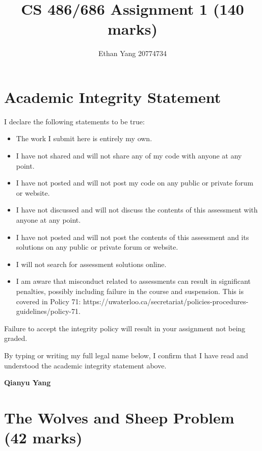 \documentclass[12pt]{article}
\title{CS 486/686 Assignment 1 (140 marks)}
\author{Ethan Yang 20774734}
\begin{document}
\maketitle
\section*{Academic Integrity Statement}

I declare the following statements to be true:

\begin{itemize}
\item 
The work I submit here is entirely my own.

\item 	
I have not shared and will not share any of my code with anyone at any point. 

\item 
I have not posted and will not post my code on any public or private forum or website.

\item 	
I have not discussed and will not discuss the contents of this assessment with anyone at any point.

\item 
I have not posted and will not post the contents of this assessment and its solutions on any public or private forum or website. 

\item 
I will not search for assessment solutions online.

\item 
I am aware that misconduct related to assessments can result in significant penalties, possibly including failure in the course and suspension. This is covered in Policy 71: https://uwaterloo.ca/secretariat/policies-procedures-guidelines/policy-71.
\end{itemize}

Failure to accept the integrity policy will result in your assignment not being graded.

By typing or writing my full legal name below, I confirm that I have read and understood the academic integrity statement above.

{\bf\large Qianyu Yang}








\newpage
\section{The Wolves and Sheep Problem (42 marks)}
\end{document}
